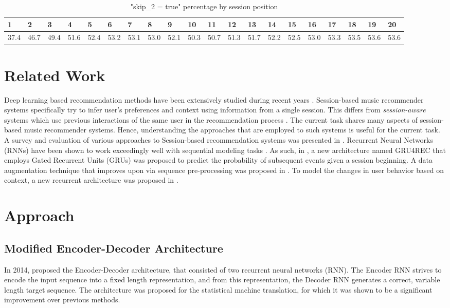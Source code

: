 \documentclass[sigconf]{acmart}
\begin{document}
\begin{table*}
\caption{"skip\_2 = true" percentage by session position}
\begin{tabular}{|l|l|l|l|l|l|l|l|l|l|l|l|l|l|l|l|l|l|l|l|}
\hline
1    & 2    & 3    & 4    & 5    & 6    & 7    & 8    & 9    & 10   & 11   & 12   & 13   & 14   & 15   & 16   & 17   & 18   & 19   & 20   \\ \hline
37.4 & 46.7 & 49.4 & 51.6 & 52.4 & 53.2 & 53.1 & 53.0 & 52.1 & 50.3 & 50.7 & 51.3 & 51.7 & 52.2 & 52.5 & 53.0 & 53.3 & 53.5 & 53.6 & 53.6 \\ \hline
\end{tabular}
\end{table*}


\section{Related Work}
Deep learning based recommendation methods have been extensively studied during recent years \cite{zhang2017deep}. Session-based music recommender systems specifically try to infer user's preferences and context using information from a single session. This differs from \textit{session-aware} systems which use previous interactions of the same user in the recommendation process \cite{quadrana2018sequence}. The current task shares many aspects of session-based music recommender systems. Hence, understanding the approaches that are employed to such systems is useful for the current task. A survey and evaluation of various approaches to Session-based recommendation systems was presented in \cite{ludewig2018evaluation}. Recurrent Neural Networks (RNNs) have been shown to work exceedingly well with sequential modeling tasks \cite{chung2014empirical}. As such, in \cite{hidasi2015session}, a new architecture named GRU4REC that employs Gated Recurrent Units (GRUs) was proposed to predict the probability of subsequent events given a session beginning. A data augmentation technique that improves upon \cite{hidasi2015session} via sequence pre-processing was proposed in \cite{tan2016improved}. To model the changes in user behavior based on context, a new recurrent architecture was proposed in \cite{smirnova2017contextual}.


\section{Approach}
\subsection{Modified Encoder-Decoder Architecture}
In 2014, \citet{cho2014learning} proposed the Encoder-Decoder architecture, that consisted of two recurrent neural networks (RNN). The Encoder RNN strives to encode the input sequence into a fixed length representation, and from this representation, the Decoder RNN generates a correct, variable length target sequence. The architecture was proposed for the statistical machine translation, for which it was shown to be a significant improvement over previous methods.
\end{document}
